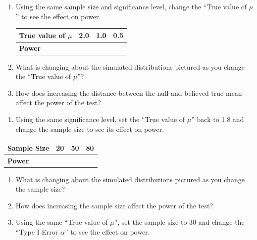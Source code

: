 \documentclass[
]{report}
\providecommand{\tightlist}{%
  \setlength{\itemsep}{0pt}\setlength{\parskip}{0pt}}
\begin{document}
\begin{enumerate}
\def\labelenumi{\arabic{enumi}.}
\setcounter{enumi}{9}
\item
  Using the same sample size and significance level, change the ``True value of \(\mu\)'' to see the effect on power.
  \setlength\tabcolsep{0.5cm}

  \begin{longtable}{|l|c|c|c|}
  \hline
  \textbf{True value of $\mu$}& 2.0 & 1.0 & 0.5\\ \hline
  \textbf{Power} & & &  \\ \hline
  \end{longtable}
\item
  What is changing about the simulated distributions pictured as you change the ``True value of \(\mu\)''?
  \vspace{0.5in}
\item
  How does increasing the distance between the null and believed true mean affect the power of the test?
  \vspace{0.5in}
\end{enumerate}

\newpage

\begin{enumerate}
\def\labelenumi{\arabic{enumi}.}
\setcounter{enumi}{12}
\tightlist
\item
  Using the same significance level, set the ``True value of \(\mu\)'' back to 1.8 and change the sample size to see its effect on power.
\end{enumerate}

\setlength\tabcolsep{0.6cm}
\begin{longtable}{|l|c|c|c|}
\hline
\textbf{Sample Size}& 20 & 50 & 80 \\ \hline
\textbf{Power} & & &  \\ \hline
\end{longtable}

\begin{enumerate}
\def\labelenumi{\arabic{enumi}.}
\setcounter{enumi}{13}
\item
  What is changing about the simulated distributions pictured as you change the sample size?
  \vspace{0.6in}
\item
  How does increasing the sample size affect the power of the test?
  \vspace{0.6in}
\item
  Using the same ``True value of \(\mu\)'', set the sample size to 30 and change the ``Type I Error \(\alpha\)'' to see the effect on power.
\end{enumerate}
\end{document}
